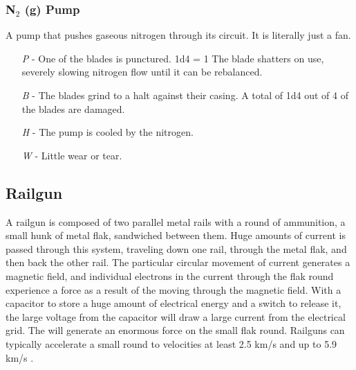 \documentclass[a4paper]{article}
\begin{document}
\vspace{-0.5cm} \hspace{-18pt} \subsubsection{N$_2$ (g) Pump} \label{thermal_n2_pump} \vspace{-0.2cm}
A pump that pushes gaseous nitrogen through its circuit. It is literally just a fan.
\begin{enumerate}
\item [\textit{P}] - One of the blades is punctured. \newline \hspace*{3pt} 1d4 = 1 The blade shatters on use, severely slowing nitrogen flow until it can be rebalanced.
\item [\textit{B}] - The blades grind to a halt against their casing. A total of 1d4 out of 4 of the blades are damaged.
\item [\textit{H}] - The pump is cooled by the nitrogen.
\item [\textit{W}] - Little wear or tear.
\end{enumerate}


\subsection{Railgun} \label{railgun}

A railgun is composed of two parallel metal rails with a round of ammunition, a small hunk of metal flak, sandwiched between them. Huge amounts of current is passed through this system, traveling down one rail, through the metal flak, and then back the other rail. The particular circular movement of current generates a magnetic field, and individual electrons in the current through the flak round experience a force as a result of the moving through the magnetic field. With a capacitor to store a huge amount of electrical energy and a switch to release it, the large voltage from the capacitor will draw a large current from the electrical grid. The will generate an enormous force on the small flak round. Railguns can typically accelerate a small round to velocities at least 2.5 km/s \cite{naval_railgun} and up to 5.9 km/s \cite{scientific_railgun}.
\end{document}
